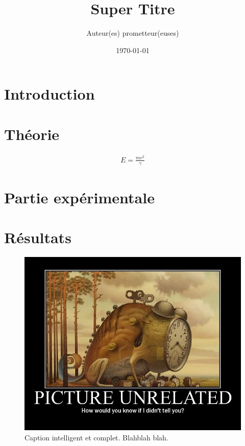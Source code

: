 \documentclass[letterpaper,12pt]{article} %
\begin{document}
\title{Super Titre}
\author{Auteur(es) prometteur(euses)}
\date{\today}

\maketitle

\section{Introduction}


\section{Théorie}


\begin{align}
\label{th_einstein}
E=\frac{mc^2}{\gamma}
\end{align}



\section{Partie expérimentale}


\section{Résultats}



\begin{figure}[htb]
\begin{center}
\includegraphics[width=\linewidth]{Images/image.jpg}
\caption{Caption intelligent et complet. Blahblah blah. \cite{key1}}
\label{Chien_Ponctuel}
\end{center}
\end{figure}
\end{document}

